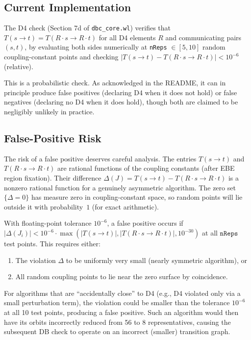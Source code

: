 \documentclass[12pt,a4paper]{article}
\theoremstyle{critical}
\theoremstyle{remark}
\begin{document}
\subsection{Current Implementation}

The D4 check (Section 7d of \texttt{dbc\_core.wl}) verifies that
$T(s\to t) = T(R\cdot s \to R\cdot t)$ for all D4 elements $R$ and communicating pairs
$(s,t)$, by evaluating both sides numerically at \texttt{nReps} $\in [5,10]$ random
coupling-constant points and checking $|T(s\to t) - T(R\cdot s \to R\cdot t)| < 10^{-6}$
(relative).

This is a probabilistic check. As acknowledged in the README, it can in principle produce
false positives (declaring D4 when it does not hold) or false negatives (declaring no D4
when it does hold), though both are claimed to be negligibly unlikely in practice.

\subsection{False-Positive Risk}

The risk of a false positive deserves careful analysis. The entries
$T(s\to t)$ and $T(R\cdot s\to R\cdot t)$ are rational functions of the coupling
constants (after EBE region fixation). Their difference $\Delta(J) = T(s\to t) -
T(R\cdot s\to R\cdot t)$ is a nonzero rational function for a genuinely asymmetric
algorithm. The zero set $\{\Delta = 0\}$ has measure zero in coupling-constant space,
so random points will lie outside it with probability~$1$ (for exact arithmetic).

With floating-point tolerance $10^{-6}$, a false positive occurs if
$|\Delta(J_i)| < 10^{-6} \cdot \max(|T(s\to t)|, |T(R\cdot s\to R\cdot t)|, 10^{-30})$
at all $\texttt{nReps}$ test points. This requires either:
\begin{enumerate}
\item The violation $\Delta$ to be uniformly very small (nearly symmetric algorithm), or
\item All random coupling points to lie near the zero surface by coincidence.
\end{enumerate}
For algorithms that are ``accidentally close'' to D4 (e.g., D4 violated only via a
small perturbation term), the violation could be smaller than the tolerance $10^{-6}$ at
all 10 test points, producing a false positive. Such an algorithm would then have its
orbits incorrectly reduced from 56 to 8 representatives, causing the subsequent DB
check to operate on an incorrect (smaller) transition graph.
\end{document}
